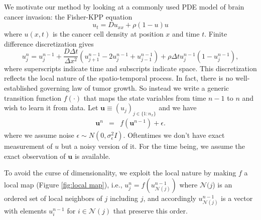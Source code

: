 \documentclass[11pt, reqno]{amsart}
\begin{document}
We motivate our method by looking at a commonly used PDE model of brain cancer invasion: the Fisher-KPP equation
\[
u_{t}=Du_{xx}+\rho (1-u)u
\]
where $u(x,t)$ is the cancer cell density at position $x$ and time $t$. Finite difference discretization gives 
\[
u_{j}^{n}=u_{j}^{n-1}+\frac{D \Delta t}{\Delta x^{2}}(u_{j+1}^{n-1}-2u_{j}^{n-1}+u_{j-1}^{n-1})+\rho \Delta t u_{j}^{n-1}(1-u_{j}^{n-1}),
\]
where superscripts indicate time and subscripts indicate space. This discretization reflects the local nature of the spatio-temporal process. In fact, there is no well-established governing law of tumor growth. So instead we write a generic transition function $f(\cdot)$ that maps the state variables from time $n-1$ to $n$ and wish to learn it from data. Let $\mathbf{u}\equiv(u_{j})_{j\in\{1:n_{x}\}}$ and we have 
\begin{eqnarray}
\mathbf{u}^{n} & = & f(\mathbf{u}^{n-1})+\epsilon\label{eq:un=00003Df(un-1)}.
\end{eqnarray}
where we assume noise $\epsilon\sim N(0,\sigma_{\epsilon}^{2}I)$. Oftentimes we don't have exact measurement of $u$ but a noisy version of it. For the time being, we assume the exact observation of $\mathbf{u}$ is available.

To avoid the curse of dimensionality, we exploit the local nature by making $f$ a local map (Figure \ref{fig:local map}), i.e., $u_{j}^{n}=f(u_{\mathcal{N}(j)}^{n-1})$ where $\mathcal{N}(j$) is an ordered set of local neighbors of $j$ including $j$, and accordingly $u_{\mathcal{N}(j)}^{n-1}$ is a vector with elements $u_{i}^{n-1}$ for $i\in\mathcal{N}(j)$ that preserve this order.
\end{document}
